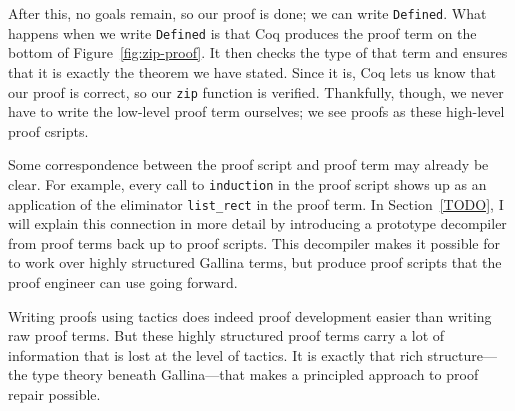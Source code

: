 After this, no goals remain, so our proof is done; we can write \lstinline{Defined}.
What happens when we write \lstinline{Defined} is that Coq produces the proof term on the bottom of Figure~\ref{fig:zip-proof}. %
It then checks the type of that term and ensures that it is exactly the theorem we have stated.
Since it is, Coq lets us know that our proof is correct, so our \lstinline{zip} function is verified.
Thankfully, though, we never have to write the low-level proof term ourselves; we see proofs as these high-level proof csripts.

Some correspondence between the proof script and proof term may already be clear.
For example, every call to \lstinline{induction} in the proof script shows up as an application of the eliminator \lstinline{list_rect}
in the proof term.
In Section~\ref{TODO}, I will explain this connection in more detail by introducing a prototype decompiler from proof terms back up to proof scripts.
This decompiler makes it possible for \sysname to work over highly structured Gallina terms,
but produce proof scripts that the proof engineer can use going forward.

Writing proofs using tactics does indeed proof development easier than writing raw proof terms.
But these highly structured proof terms carry a lot of information that is lost at the level of tactics.
It is exactly that rich structure---the type theory beneath Gallina---that makes a principled approach to proof repair possible.



